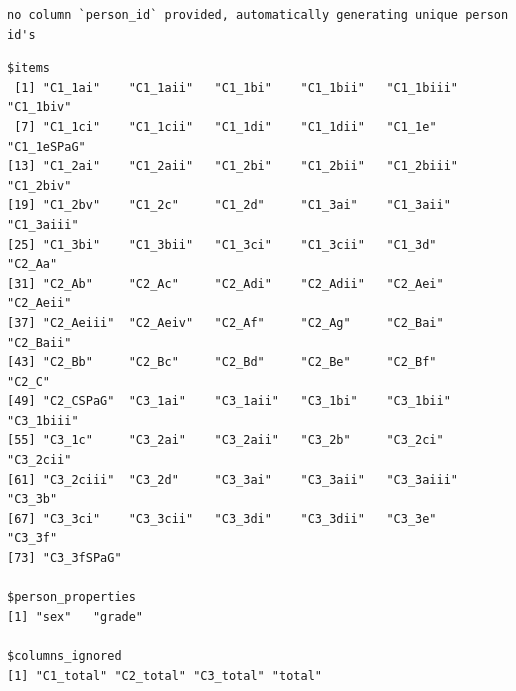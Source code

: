 \documentclass[
  letterpaper,
  DIV=11,
  numbers=noendperiod]{scrreprt}
\newenvironment{Shaded}{\begin{snugshade}}{\end{snugshade}}
\newcommand{\CommentTok}[1]{\textcolor[rgb]{0.37,0.37,0.37}{#1}}
\newcommand{\FunctionTok}[1]{\textcolor[rgb]{0.28,0.35,0.67}{#1}}
\newcommand{\NormalTok}[1]{\textcolor[rgb]{0.00,0.23,0.31}{#1}}
\newcommand{\OtherTok}[1]{\textcolor[rgb]{0.00,0.23,0.31}{#1}}
\newcommand{\SpecialCharTok}[1]{\textcolor[rgb]{0.37,0.37,0.37}{#1}}
\begin{document}
\begin{verbatim}
no column `person_id` provided, automatically generating unique person id's
\end{verbatim}

\begin{verbatim}
$items
 [1] "C1_1ai"    "C1_1aii"   "C1_1bi"    "C1_1bii"   "C1_1biii"  "C1_1biv"  
 [7] "C1_1ci"    "C1_1cii"   "C1_1di"    "C1_1dii"   "C1_1e"     "C1_1eSPaG"
[13] "C1_2ai"    "C1_2aii"   "C1_2bi"    "C1_2bii"   "C1_2biii"  "C1_2biv"  
[19] "C1_2bv"    "C1_2c"     "C1_2d"     "C1_3ai"    "C1_3aii"   "C1_3aiii" 
[25] "C1_3bi"    "C1_3bii"   "C1_3ci"    "C1_3cii"   "C1_3d"     "C2_Aa"    
[31] "C2_Ab"     "C2_Ac"     "C2_Adi"    "C2_Adii"   "C2_Aei"    "C2_Aeii"  
[37] "C2_Aeiii"  "C2_Aeiv"   "C2_Af"     "C2_Ag"     "C2_Bai"    "C2_Baii"  
[43] "C2_Bb"     "C2_Bc"     "C2_Bd"     "C2_Be"     "C2_Bf"     "C2_C"     
[49] "C2_CSPaG"  "C3_1ai"    "C3_1aii"   "C3_1bi"    "C3_1bii"   "C3_1biii" 
[55] "C3_1c"     "C3_2ai"    "C3_2aii"   "C3_2b"     "C3_2ci"    "C3_2cii"  
[61] "C3_2ciii"  "C3_2d"     "C3_3ai"    "C3_3aii"   "C3_3aiii"  "C3_3b"    
[67] "C3_3ci"    "C3_3cii"   "C3_3di"    "C3_3dii"   "C3_3e"     "C3_3f"    
[73] "C3_3fSPaG"

$person_properties
[1] "sex"   "grade"

$columns_ignored
[1] "C1_total" "C2_total" "C3_total" "total"   
\end{verbatim}

\begin{Shaded}
\end{Shaded}
\end{document}
